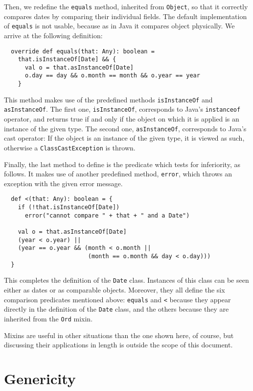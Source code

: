 \documentclass[a4paper,11pt,twoside,titlepage]{article}
\begin{document}
Then, we redefine the \lstinline?equals? method, inherited from
\lstinline?Object?, so that it correctly compares dates by comparing their
individual fields. The default implementation of \lstinline?equals? is not
usable, because as in Java it compares object physically. We arrive
at the following definition:
\begin{lstlisting}
  override def equals(that: Any): boolean =
    that.isInstanceOf[Date] && {
      val o = that.asInstanceOf[Date]
      o.day == day && o.month == month && o.year == year
    }
\end{lstlisting}
This method makes use of the predefined methods \lstinline?isInstanceOf?
and \lstinline?asInstanceOf?. The first one, \lstinline?isInstanceOf?,
corresponds to Java's \lstinline?instanceof? operator, and returns true
if and only if the object on which it is applied is an instance of the
given type. The second one, \lstinline?asInstanceOf?, corresponds to
Java's cast operator: If the object is an instance of the given type,
it is viewed as such, otherwise a \lstinline?ClassCastException? is
thrown.

Finally, the last method to define is the predicate which tests for
inferiority, as follows. It makes use of another predefined method,
\lstinline?error?, which throws an exception with the given error message.
\begin{lstlisting}
  def <(that: Any): boolean = {
    if (!that.isInstanceOf[Date])
      error("cannot compare " + that + " and a Date")

    val o = that.asInstanceOf[Date]
    (year < o.year) ||
    (year == o.year && (month < o.month ||
                        (month == o.month && day < o.day)))
  }
\end{lstlisting}
This completes the definition of the \lstinline?Date? class. Instances of
this class can be seen either as dates or as comparable objects.
Moreover, they all define the six comparison predicates mentioned
above: \lstinline?equals? and \lstinline?<? because they appear directly in
the definition of the \lstinline?Date? class, and the others because they
are inherited from the \lstinline?Ord? mixin.

Mixins are useful in other situations than the one shown here, of
course, but discussing their applications in length is outside the
scope of this document.

\section*{Genericity}
\label{sec:genericity}
\end{document}
